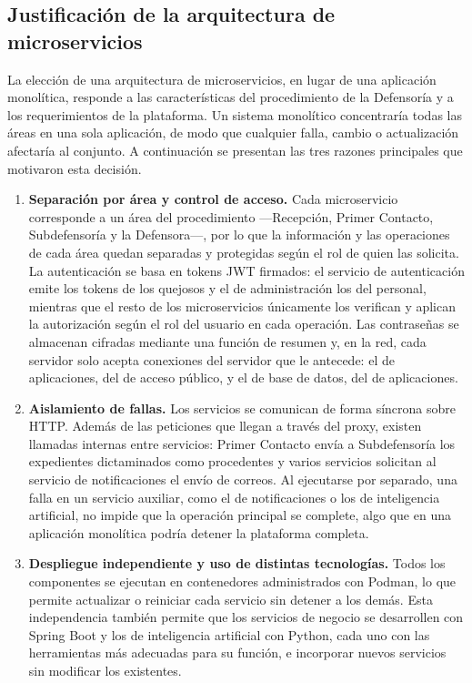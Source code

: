 \subsection{Justificación de la arquitectura de microservicios}
\label{subsec:justificacion_microservicios}
La elección de una arquitectura de microservicios, en lugar de una aplicación monolítica, responde a las características del procedimiento de la Defensoría y a los requerimientos de la plataforma. Un sistema monolítico concentraría todas las áreas en una sola aplicación, de modo que cualquier falla, cambio o actualización afectaría al conjunto. A continuación se presentan las tres razones principales que motivaron esta decisión.

\begin{enumerate}
	\item \textbf{Separación por área y control de acceso.} Cada microservicio corresponde a un área del procedimiento ---Recepción, Primer Contacto, Subdefensoría y la Defensora---, por lo que la información y las operaciones de cada área quedan separadas y protegidas según el rol de quien las solicita. La autenticación se basa en tokens JWT firmados: el servicio de autenticación emite los tokens de los quejosos y el de administración los del personal, mientras que el resto de los microservicios únicamente los verifican y aplican la autorización según el rol del usuario en cada operación. Las contraseñas se almacenan cifradas mediante una función de resumen y, en la red, cada servidor solo acepta conexiones del servidor que le antecede: el de aplicaciones, del de acceso público, y el de base de datos, del de aplicaciones.

	\item \textbf{Aislamiento de fallas.} Los servicios se comunican de forma síncrona sobre HTTP. Además de las peticiones que llegan a través del proxy, existen llamadas internas entre servicios: Primer Contacto envía a Subdefensoría los expedientes dictaminados como procedentes y varios servicios solicitan al servicio de notificaciones el envío de correos. Al ejecutarse por separado, una falla en un servicio auxiliar, como el de notificaciones o los de inteligencia artificial, no impide que la operación principal se complete, algo que en una aplicación monolítica podría detener la plataforma completa.

	\item \textbf{Despliegue independiente y uso de distintas tecnologías.} Todos los componentes se ejecutan en contenedores administrados con Podman, lo que permite actualizar o reiniciar cada servicio sin detener a los demás. Esta independencia también permite que los servicios de negocio se desarrollen con Spring Boot y los de inteligencia artificial con Python, cada uno con las herramientas más adecuadas para su función, e incorporar nuevos servicios sin modificar los existentes.
\end{enumerate}

